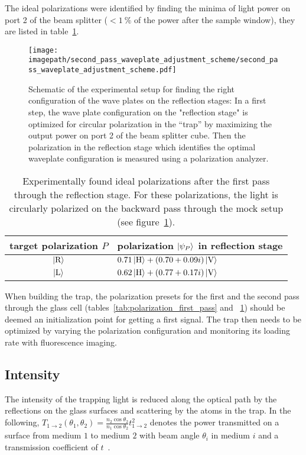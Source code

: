 The ideal polarizations were identified by finding the minima of light power on port 2 of the beam splitter ($< \SI{1}{\percent}$ of the power after the sample window), they are listed in table~\ref{tab:polarization_second_pass}.

\begin{figure}
    \centering
    \texttt{[image: \\imagepath/second\_pass\_waveplate\_adjustment\_scheme/second\_pass\_waveplate\_adjustment\_scheme.pdf]}
    \caption{Schematic of the experimental setup for finding the right configuration of the wave plates on the reflection stages: In a first step, the wave plate configuration on the "reflection stage" is optimized for circular polarization in the ``trap'' by maximizing the output power on port 2 of the beam splitter cube. Then the polarization in the reflection stage which identifies the optimal waveplate configuration is measured using a polarization analyzer.}\label{fig:second_pass_waveplate_adjustment_scheme}
\end{figure}

\begin{table}
    \centering
    \begin{tabular}{cl}
        \toprule
        target polarization $P$ & polarization $\Ket{\psi_P}$ in reflection stage \\
        \midrule
        $\Ket{\text{R}}$ & $0.71 \Ket{\text{H}} + (0.70+0.09i) \Ket{\text{V}}$ \\
        $\Ket{\text{L}}$ & $0.62\Ket{\text{H}} + (0.77+0.17i)\Ket{\text{V}}$ \\
        \bottomrule
    \end{tabular}
    \caption{Experimentally found ideal polarizations after the first pass through the reflection stage. For these polarizations, the light is circularly polarized on the backward pass through the mock setup (see figure~\ref{fig:second_pass_waveplate_adjustment_scheme}).}
        \label{tab:polarization_second_pass}
\end{table}

When building the trap, the polarization presets for the first and the second pass through the glass cell (tables~\ref{tab:polarization_first_pass} and ~\ref{tab:polarization_second_pass}) should be deemed an initialization point for getting a first signal. The trap then needs to be optimized by varying the polarization configuration and monitoring its loading rate with fluorescence imaging.

\subsection*{Intensity}
The intensity of the trapping light is reduced along the optical path by the reflections on the glass surfaces and scattering by the atoms in the trap. In the following, $T_{1 \rightarrow 2}(\theta_1, \theta_2) = \frac{n_2 \cos \theta_2 }{n_1 \cos \theta_2} t_{1\rightarrow 2}^2$ denotes the power transmitted on a surface from medium $1$ to medium $2$ with beam angle $\theta_i$ in medium $i$ and a transmission coefficient of $t$~\cite{demtroder_elektromagnetische_2013}.

